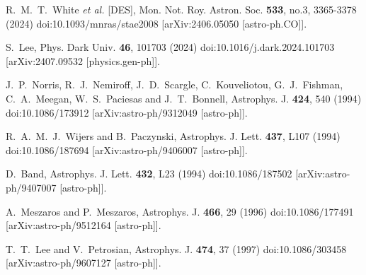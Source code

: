 \documentclass[jkps,preprint,fleqn]{revtex4} %
\begin{document}
\begin{thebibliography}{999}
R.~M.~T.~White \textit{et al.} [DES],
Mon. Not. Roy. Astron. Soc. \textbf{533}, no.3, 3365-3378 (2024)
doi:10.1093/mnras/stae2008
[arXiv:2406.05050 [astro-ph.CO]].

S.~Lee,
Phys. Dark Univ. \textbf{46}, 101703 (2024)
doi:10.1016/j.dark.2024.101703
[arXiv:2407.09532 [physics.gen-ph]].






J.~P.~Norris, R.~J.~Nemiroff, J.~D.~Scargle, C.~Kouveliotou, G.~J.~Fishman, C.~A.~Meegan, W.~S.~Paciesas and J.~T.~Bonnell,
Astrophys. J. \textbf{424}, 540 (1994)
doi:10.1086/173912
[arXiv:astro-ph/9312049 [astro-ph]].


R.~A.~M.~J.~Wijers and B.~Paczynski,
Astrophys. J. Lett. \textbf{437}, L107 (1994)
doi:10.1086/187694
[arXiv:astro-ph/9406007 [astro-ph]].


D.~Band,
Astrophys. J. Lett. \textbf{432}, L23 (1994)
doi:10.1086/187502
[arXiv:astro-ph/9407007 [astro-ph]].


A.~Meszaros and P.~Meszaros,
Astrophys. J. \textbf{466}, 29 (1996)
doi:10.1086/177491
[arXiv:astro-ph/9512164 [astro-ph]].


T.~T.~Lee and V.~Petrosian,
Astrophys. J. \textbf{474}, 37 (1997)
doi:10.1086/303458
[arXiv:astro-ph/9607127 [astro-ph]].



\end{thebibliography}
\end{document}
